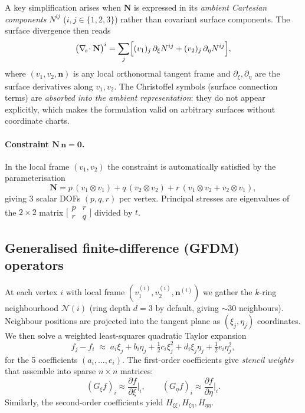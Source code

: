 \documentclass[11pt]{article}
\newcommand{\vv}[1]{\bm{#1}}          %
\newcommand{\nn}{\vv{n}}               %
\newcommand{\Nb}{\mathbf{N}}           %
\newcommand{\divs}{\nabla_{\!s}\!\cdot}
\newcommand{\tp}{\otimes}              %
\begin{document}
A key simplification arises when $\Nb$ is expressed in its \emph{ambient
Cartesian components} $N^{ij}$ ($i,j\in\{1,2,3\}$) rather than covariant
surface components.  The surface divergence then reads
\begin{equation}
  \bigl(\divs\Nb\bigr)^i
    = \sum_j\Bigl[
        (v_1)_j\,\partial_\xi N^{ij} + (v_2)_j\,\partial_\eta N^{ij}
      \Bigr],
  \label{eq:divs-ambient}
\end{equation}
where $(v_1,v_2,\nn)$ is any local orthonormal tangent frame and
$\partial_\xi,\partial_\eta$ are the surface derivatives along $v_1,v_2$.  The
Christoffel symbols (surface connection terms) are \emph{absorbed into the
ambient representation}: they do not appear explicitly, which makes the
formulation valid on arbitrary surfaces without coordinate charts.

\paragraph{Constraint $\Nb\,\nn=\vv 0$.}  In the local frame $(v_1,v_2)$ the
constraint is automatically satisfied by the parameterisation
\begin{equation}
  \Nb = p\,(v_1\tp v_1) + q\,(v_2\tp v_2) + r\,(v_1\tp v_2 + v_2\tp v_1),
  \label{eq:dofs}
\end{equation}
giving 3 scalar DOFs $(p,q,r)$ per vertex.  Principal stresses are eigenvalues
of the $2\times 2$ matrix $\bigl[\begin{smallmatrix}p&r\\r&q\end{smallmatrix}\bigr]$
divided by $t$.

\subsection{Generalised finite-difference (GFDM) operators}

At each vertex $i$ with local frame $(v_1^{(i)},v_2^{(i)},\nn^{(i)})$ we
gather the $k$-ring neighbourhood $\mathcal{N}(i)$ (ring depth $d=3$ by
default, giving $\sim\!30$ neighbours).  Neighbour positions are projected into
the tangent plane as $(\xi_j,\eta_j)$ coordinates.  We then solve a
weighted least-squares quadratic Taylor expansion
\begin{equation}
  f_j - f_i \;\approx\;
    a_i\xi_j + b_i\eta_j
    + \tfrac12 c_i\xi_j^2 + d_i\xi_j\eta_j + \tfrac12 e_i\eta_j^2,
  \label{eq:taylor}
\end{equation}
for the 5 coefficients $(a_i,\dots,e_i)$.  The first-order coefficients give
\emph{stencil weights} that assemble into sparse $n\times n$ matrices:
\begin{equation}
  (G_\xi f)_i \approx \frac{\partial f}{\partial\xi}\Big|_i,
  \qquad
  (G_\eta f)_i \approx \frac{\partial f}{\partial\eta}\Big|_i.
  \label{eq:gfdm-ops}
\end{equation}
Similarly, the second-order coefficients yield $H_{\xi\xi},H_{\xi\eta},H_{\eta\eta}$.
\end{document}
